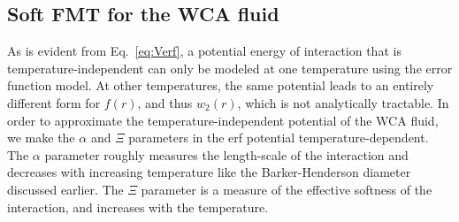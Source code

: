\documentclass[letterpaper,twocolumn,amsmath,amssymb,prb]{revtex4-1}
\begin{document}
\subsection{Soft FMT for the WCA fluid}





As is evident from Eq.~\ref{eq:Verf}, a potential energy of interaction 
that is temperature-independent can only be modeled at one temperature 
using the error function model.
At other temperatures, the same potential leads
to an entirely different form for $f(r)$, and thus $w_2(r)$, which is not
analytically tractable. 
In order to approximate the temperature-independent potential of the WCA 
fluid, we make the $\alpha$ and $\Xi$ parameters in the erf potential 
temperature-dependent.
The $\alpha$ parameter roughly measures the length-scale of the
interaction and decreases with increasing temperature 
like the Barker-Henderson diameter 
discussed earlier. 
The $\Xi$ parameter is a measure of the effective softness of the 
interaction, and increases with the temperature.
\end{document}
